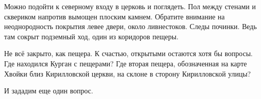 



Можно подойти к северному входу в церковь и поглядеть. Пол между стенами и сквериком напротив вымощен плоским камнем. Обратите внимание на неоднородность покрытия левее двери, около ливнестоков. Следы починки. Ведь там сокрыт подземный ход, один из коридоров пещеры.

Не всё закрыто, как пещера. К счастью, открытыми остаются хотя бы вопросы. Где находился Курган с пещерами? Где вторая пещера, обозначенная на карте Хвойки близ Кирилловской церкви, на склоне в сторону Кирилловской улицы?

И зададим еще один вопрос.
